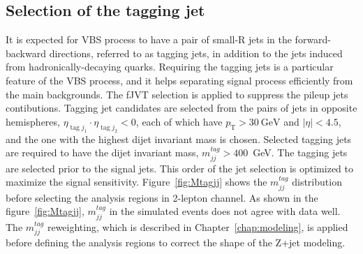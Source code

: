\subsection{Selection of the tagging jet}
It is expected for VBS process to have a pair of small-R jets in the forward-backward directions, referred to as tagging jets, in addition to the jets induced from hadronically-decaying quarks.
Requiring the tagging jets is a particular feature of the VBS process, and it helps separating signal process efficiently from the main backgrounds.
The fJVT selection is applied to suppress the pileup jets contibutions. Tagging jet candidates are selected from the pairs of jets in opposite hemispheres, $\eta_{\operatorname{tag} j_{1}} \cdot \eta_{\operatorname{tag} j_{2}}<0$, each of which have $p_\mathrm{T} > 30~\mathrm{GeV}$ and $|\eta| < 4.5$, and the one with the highest dijet invariant mass is chosen.  
Selected tagging jets are required to have the dijet invariant mass, $m^{tag}_{jj} > 400$~GeV.
The tagging jets are selected prior to the signal jets. This order of the jet selection is optimized to maximize the signal sensitivity.
Figure~\ref{fig:Mtagjj} shows the $m^{tag}_{jj}$ distribution before selecting the analysis regions in 2-lepton channel.
As shown in the figure~\ref{fig:Mtagjj}, $m^{tag}_{jj}$ in the simulated events does not agree with data well.
The $m^{tag}_{jj}$ reweighting, which is described in Chapter~\ref{chap:modeling}, is applied before defining the analysis regions to correct the shape of the Z+jet modeling.

